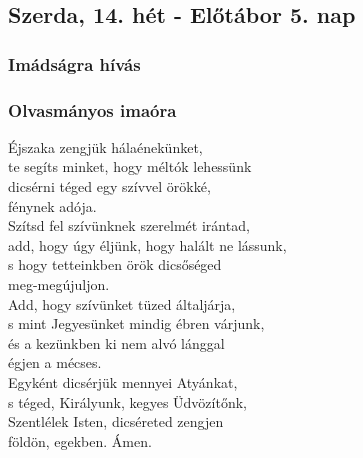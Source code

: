 \documentclass[twoside]{article}
\begin{document}
\subsection*{Szerda, 14. hét - Előtábor 5. nap}

\label{f4/Inv}

\subsubsection*{Imádságra hívás}



\subsubsection*{Olvasmányos imaóra}



Éjszaka zengjük hálaénekünket,\\
te segíts minket, hogy méltók lehessünk\\
dicsérni téged egy szívvel örökké,\\
fénynek adója.\\

Szítsd fel szívünknek szerelmét irántad,\\
add, hogy úgy éljünk, hogy halált ne lássunk,\\
s hogy tetteinkben örök dicsőséged\\
meg-megújuljon.\\

Add, hogy szívünket tüzed általjárja,\\
s mint Jegyesünket mindig ébren várjunk,\\
és a kezünkben ki nem alvó lánggal\\
égjen a mécses.\\

Egyként dicsérjük mennyei Atyánkat,\\
s téged, Királyunk, kegyes Üdvözítőnk,\\
Szentlélek Isten, dicséreted zengjen\\
földön, egekben. Ámen.\\


\end{document}
